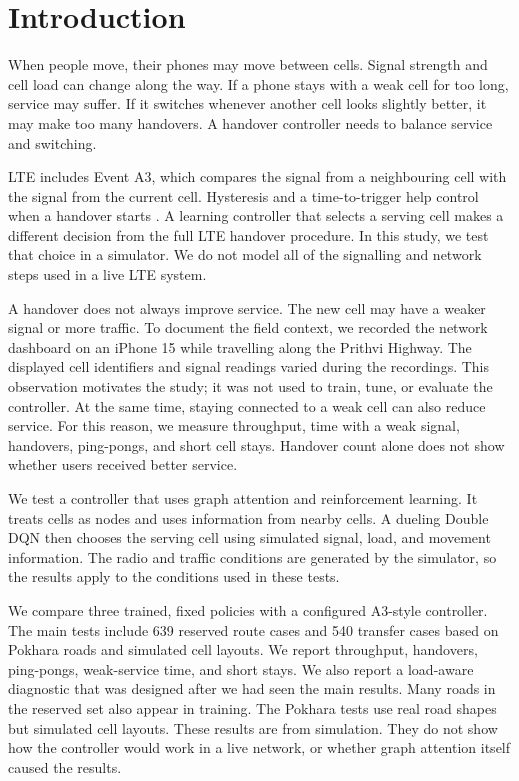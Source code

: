 \documentclass[fleqn,10pt,twoside]{IOEGC}
\begin{document}
\maketitle
\thispagestyle{firstpage}

\section{Introduction}
When people move, their phones may move between cells. Signal strength and cell load can change along the way. If a phone stays with a weak cell for too long, service may suffer. If it switches whenever another cell looks slightly better, it may make too many handovers. A handover controller needs to balance service and switching.

LTE includes Event A3, which compares the signal from a neighbouring cell with the signal from the current cell. Hysteresis and a time-to-trigger help control when a handover starts \cite{3gpp36}. A learning controller that selects a serving cell makes a different decision from the full LTE handover procedure. In this study, we test that choice in a simulator. We do not model all of the signalling and network steps used in a live LTE system.

A handover does not always improve service. The new cell may have a weaker signal or more traffic. To document the field context, we recorded the network dashboard on an iPhone 15 while travelling along the Prithvi Highway. The displayed cell identifiers and signal readings varied during the recordings. This observation motivates the study; it was not used to train, tune, or evaluate the controller. At the same time, staying connected to a weak cell can also reduce service. For this reason, we measure throughput, time with a weak signal, handovers, ping-pongs, and short cell stays. Handover count alone does not show whether users received better service.

We test a controller that uses graph attention and reinforcement learning. It treats cells as nodes and uses information from nearby cells. A dueling Double DQN then chooses the serving cell using simulated signal, load, and movement information. The radio and traffic conditions are generated by the simulator, so the results apply to the conditions used in these tests.

We compare three trained, fixed policies with a configured A3-style controller. The main tests include 639 reserved route cases and 540 transfer cases based on Pokhara roads and simulated cell layouts. We report throughput, handovers, ping-pongs, weak-service time, and short stays. We also report a load-aware diagnostic that was designed after we had seen the main results. Many roads in the reserved set also appear in training. The Pokhara tests use real road shapes but simulated cell layouts. These results are from simulation. They do not show how the controller would work in a live network, or whether graph attention itself caused the results.
\end{document}

